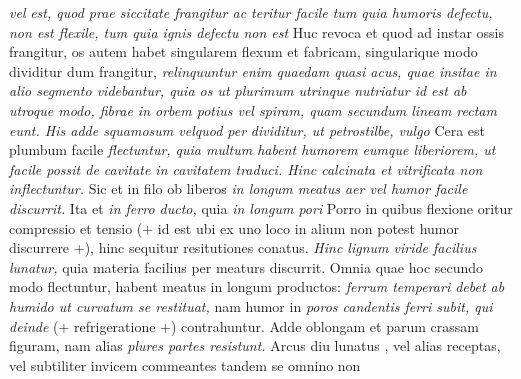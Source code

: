 \pend%
\pstart%
\textit{}%
\textit{vel }%
\textit{}%
\textit{est, quod prae siccitate frangitur ac teritur facile tum quia humoris defectu\protect{},
non est flexile, tum quia ignis defectu non est} 
Huc revoca et quod ad instar ossis frangitur, os autem habet singularem flexum et fabricam, singularique modo dividitur dum frangitur,
\textit{relinquuntur enim quaedam quasi acus, quae insitae in alio segmento videbantur, quia
os ut plurimum utrinque nutriatur id est ab utroque modo,
fibrae in orbem potius vel spiram, quam secundum lineam rectam eunt.
His adde squamosum\protect{} vel}\textit{}\textit{quod per}
\textit{dividitur, ut petrostilbe, vulgo }
\pend
\pstart {} Cera est plumbum facile \textit{flectuntur, quia multum habent humorem eumque liberiorem, ut facile possit de cavitate in cavitatem traduci. Hinc calcinata et vitrificata non inflectuntur.} Sic et in filo ob liberos \textit{in longum meatus aer vel humor facile discurrit.} Ita et\textit{ in ferro ducto,} quia
\textit{in longum pori } Porro in quibus flexione oritur compressio\protect{} et tensio\protect{} (+ id est ubi ex uno loco in alium non potest humor discurrere +), hinc sequitur resitutiones conatus.
\textit{Hinc lignum viride facilius lunatur,} quia materia facilius per meaturs discurrit. Omnia quae hoc secundo modo flectuntur, habent meatus in longum productos: \textit{ferrum temperari debet ab humido ut curvatum se restituat,} nam humor in
\textit{poros candentis ferri subit, qui deinde} (+ refrigeratione\protect{} +) contrahuntur. Adde oblongam et parum crassam figuram, nam alias
\textit{plures partes resistunt.} Arcus diu lunatus\protect{} , vel alias receptas, vel subtiliter invicem commeantes tandem se omnino non 
